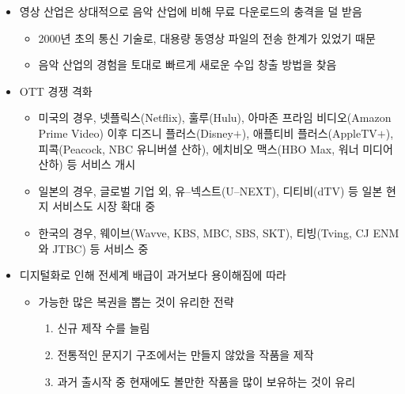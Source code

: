 \begin{itemize}
\item 영상 산업은 상대적으로 음악 산업에 비해 무료 다운로드의 충격을 덜 받음
	\begin{itemize}
	\item 2000년 초의 통신 기술로, 대용량 동영상 파일의 전송 한계가 있었기 때문
	\item 음악 산업의 경험을 토대로 빠르게 새로운 수입 창출 방법을 찾음
	\end{itemize}	
\item OTT 경쟁 격화
	\begin{itemize}
	\item 미국의 경우, 넷플릭스(Netflix), 훌루(Hulu), 아마존 프라임 비디오(Amazon Prime Video) 이후 디즈니 플러스(Disney$+$), 애플티비 플러스(AppleTV$+$), 피콕(Peacock, NBC 유니버셜 산하), 에치비오 맥스(HBO Max, 워너 미디어 산하) 등 서비스 개시
	\item 일본의 경우, 글로벌 기업 외, 유--넥스트(U--NEXT), 디티비(dTV) 등 일본 현지 서비스도 시장 확대 중
	\item 한국의 경우, 웨이브(Wavve, KBS, MBC, SBS, SKT), 티빙(Tving, CJ ENM와 JTBC) 등 서비스 중
	\end{itemize}	
\item 디지털화로 인해 전세계 배급이 과거보다 용이해짐에 따라
	\begin{itemize}
	\item 가능한 많은 복권을 뽑는 것이 유리한 전략 \cite[p. 202]{Waldfogel:2017aa}
		\begin{enumerate}
		\item 신규 제작 수를 늘림
		\item 전통적인 문지기 구조에서는 만들지 않았을 작품을 제작  
		\item 과거 출시작 중 현재에도 볼만한 작품을 많이 보유하는 것이 유리
		\end{enumerate}
	\end{itemize}
\end{itemize}



